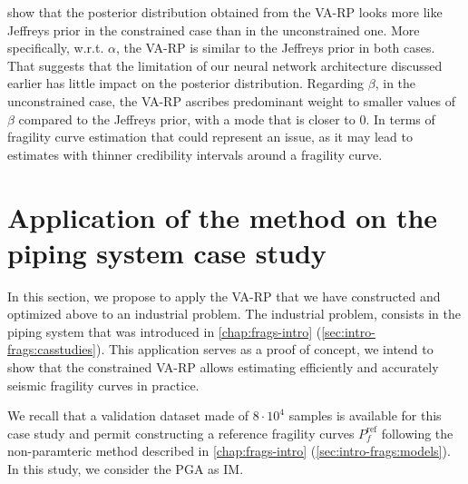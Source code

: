  show that the posterior distribution obtained from the VA-RP looks more like Jeffreys prior %
in the constrained case than in the unconstrained one. 
More specifically, w.r.t. $\alpha$, the VA-RP is similar to the Jeffreys prior in both cases. That suggests that the limitation of our neural network architecture discussed earlier has little impact on the posterior distribution.
Regarding $\beta$,
in the unconstrained case, the VA-RP ascribes predominant weight to smaller values of $\beta$ compared to the Jeffreys prior, with a mode that is closer to $0$. In terms of fragility curve estimation that could represent an issue, as it may lead to estimates with thinner credibility intervals around a fragility curve. %









\section{Application of the method on the piping system case study}\label{sec:constr-frags:appasg}


In this section, we propose to apply the VA-RP that we have constructed and optimized above
to an industrial problem.
The industrial problem,  consists in the piping system that was introduced in   \cref{chap:frags-intro} (\cref{sec:intro-frags:casstudies}). 
This application serves as a proof of concept, we intend to show that the constrained VA-RP allows estimating efficiently and accurately seismic fragility curves in practice.

We recall that a validation dataset made of $8\cdot 10^4$ samples is available for this case study and permit constructing a reference fragility curves $P_f^{\text{ref}}$ following the non-paramteric method described in \cref{chap:frags-intro} (\cref{sec:intro-frags:models}).
In this study, we consider the PGA as IM.







